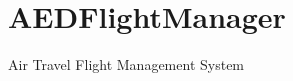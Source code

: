\chapter{AEDFlight\+Manager}
\hypertarget{index}{}\label{index}
\label{index_md__c_1_2_dados_2_uni_22ano_21semestre_2_a_e_d_2_a_e_d_flight_manager_2_r_e_a_d_m_e}%
%
Air Travel Flight Management System 